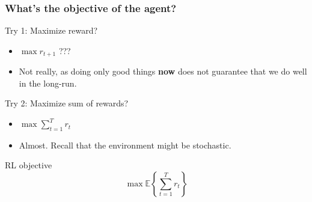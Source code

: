 \begin{frame}
    \frametitle{What's the objective of the agent?}
    \begin{block}{Try 1: Maximize reward?}
        \begin{itemize}
            \item $\max r_{t+1}$ ???
            \pause
            \item Not really, as doing only good things \textbf{now} does
                  not guarantee that we do well in the long-run.
        \end{itemize}
    \end{block}
    \pause
    \begin{block}{Try 2: Maximize sum of rewards?}
        \begin{itemize}
            \item $\max \sum_{t=1}^{T} r_{t}$
            \pause
            \item Almost. Recall that the environment might be stochastic.
        \end{itemize}
    \end{block}
    \pause
    \begin{block}{RL objective}
        \begin{equation*}
            \max \mathbb{E} \left \{ \sum_{t=1}^{T} r_{t} \right \}
        \end{equation*}
    \end{block}
\end{frame}